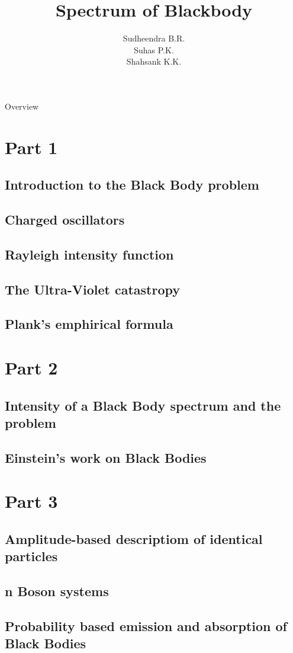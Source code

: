 \documentclass[aspectratio=169]{beamer}
\title{Spectrum of Blackbody}
\institute{{\footnotesize Guided by V.H. Belvadi} \\ Yuvaraja's College, Mysuru}
\author{Sudheendra B.R. \\ Suhas P.K. \\ Shahsank K.K.}
\date{}
\begin{document}
\begin{frame}[noframenumbering]
	\titlepage
\end{frame}

\begin{frame}[noframenumbering]{Overview}
	\begin{multicols}{2}
		\tableofcontents[sections={1}]

		\columnbreak

		\tableofcontents[sections={2-3}]
	\end{multicols}
\end{frame}

\section{Part 1}
\subsection{Introduction to the Black Body problem}

\subsection{Charged oscillators}
 
\subsection{Rayleigh intensity function}
 
\subsection{The Ultra-Violet catastropy} 

\subsection{Plank's emphirical formula}

\section{Part 2}
\subsection{Intensity of a Black Body spectrum and the problem}

\subsection{Einstein's work on Black Bodies}

\section{Part 3}

\subsection{Amplitude-based descriptiom of identical particles}

\subsection{n Boson systems}

\subsection{Probability based emission and absorption of Black Bodies}
\end{document}
